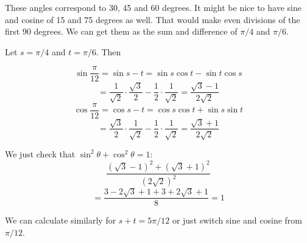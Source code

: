 \documentclass[11pt, oneside]{article}
\begin{document}
These angles correspond to 30, 45 and 60 degrees.  It might be nice to have sine and cosine of 15 and 75 degrees as well.  That would make even divisions of the first 90 degrees.  We can get them as the sum and difference of $\pi/4$ and $\pi/6$.

Let $s = \pi/4$ and $t = \pi/6$.  Then

\[ \sin \frac{\pi}{12} = \sin s - t = \sin s \cos t - \sin t \cos s \]
\[ = \frac{1}{\sqrt{2}} \cdot \frac{\sqrt{3}}{2} - \frac{1}{2} \cdot \frac{1}{\sqrt{2}} = \frac{\sqrt{3} - 1}{2 \sqrt{2}} \]
\[ \cos \frac{\pi}{12} = \cos s - t = \cos s \cos t + \sin s \sin t \]
\[ = \frac{\sqrt{3}}{2} \cdot \frac{1}{\sqrt{2}} - \frac{1}{2} \cdot \frac{1}{\sqrt{2}} = \frac{\sqrt{3} + 1}{2 \sqrt{2}} \]

We just check that $\sin^2 \theta + \cos^2 \theta = 1$:
\[ \frac{(\sqrt{3} - 1)^2 + (\sqrt{3} + 1)^2}{(2 \sqrt{2})^2} \]
\[ = \frac{3 - 2 \sqrt{3} + 1 + 3 + 2 \sqrt{3} + 1}{8} = 1 \]

We can calculate similarly for $s + t = 5 \pi/12$ or just switch sine and cosine from $\pi/12$.
\end{document}
